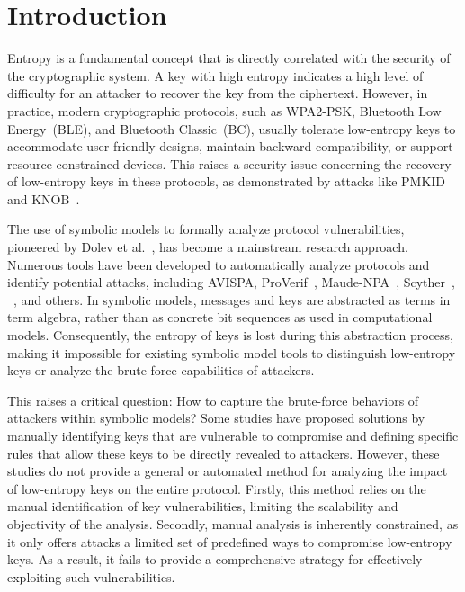 \section{Introduction}

Entropy is a fundamental concept that is directly correlated with the security of the cryptographic system.
A key with high entropy indicates a high level of difficulty for an attacker to recover the key from the ciphertext.
However, in practice, modern cryptographic protocols, such as WPA2-PSK, Bluetooth Low Energy~(BLE), and Bluetooth Classic~(BC), usually tolerate low-entropy keys to accommodate user-friendly designs, maintain backward compatibility, or support resource-constrained devices.
This raises a security issue concerning the recovery of low-entropy keys in these protocols, as demonstrated by attacks like PMKID~\cite{pmkidattack} and KNOB~\cite{antonioli2019knob}.

The use of symbolic models to formally analyze protocol vulnerabilities, pioneered by Dolev et al.~\cite{dolev1983security}, has become a mainstream research approach.
Numerous tools have been developed to automatically analyze protocols and identify potential attacks, including AVISPA\cite{armando2005avispa}, ProVerif~\cite{blanchet2018proverif}, Maude-NPA~\cite{escobar2007maude}, Scyther~\cite{cremers2008scyther}, \Tamarin{}~\cite{meier2013tamarin}, and others.
In symbolic models, messages and keys are abstracted as terms in term algebra, rather than as concrete bit sequences as used in computational models.
Consequently, the entropy of keys is lost during this abstraction process, making it impossible for existing symbolic model tools to distinguish low-entropy keys or analyze the brute-force capabilities of attackers.

This raises a critical question: How to capture the brute-force behaviors of attackers within symbolic models?
Some studies\cite{shi2023blesc, claverie2023tamarin} have proposed solutions by manually identifying keys that are vulnerable to compromise and defining specific rules that allow these keys to be directly revealed to attackers.
However, these studies do not provide a general or automated method for analyzing the impact of low-entropy keys on the entire protocol.
Firstly, this method relies on the manual identification of key vulnerabilities, limiting the scalability and objectivity of the analysis.
Secondly, manual analysis is inherently constrained, as it only offers attacks a limited set of predefined ways to compromise low-entropy keys.
As a result, it fails to provide a comprehensive strategy for effectively exploiting such vulnerabilities.


